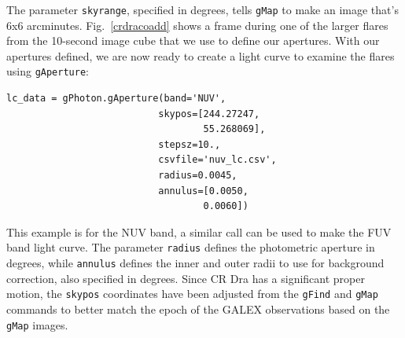 \documentclass[iop]{emulateapj}
\begin{document}
The parameter \texttt{skyrange}, specified in degrees, tells \texttt{gMap} to make an image that's 6x6 arcminutes.  Fig.\ \ref{crdracoadd} shows a frame during one of the larger flares from the 10-second image cube that we use to define our apertures.  With our apertures defined, we are now ready to create a light curve to examine the flares using \texttt{gAperture}:

\begin{verbatim}
lc_data = gPhoton.gAperture(band='NUV',
                           skypos=[244.27247,
                                   55.268069],
                           stepsz=10.,
                           csvfile='nuv_lc.csv',
                           radius=0.0045,
                           annulus=[0.0050,
                                   0.0060])
\end{verbatim}

This example is for the NUV band, a similar call can be used to make the FUV band light curve.  The parameter \texttt{radius} defines the photometric aperture in degrees, while \texttt{annulus} defines the inner and outer radii to use for background correction, also specified in degrees.  Since CR Dra has a significant proper motion, the \texttt{skypos} coordinates have been adjusted from the \texttt{gFind} and \texttt{gMap} commands to better match the epoch of the GALEX observations based on the \texttt{gMap} images.
\end{document}
